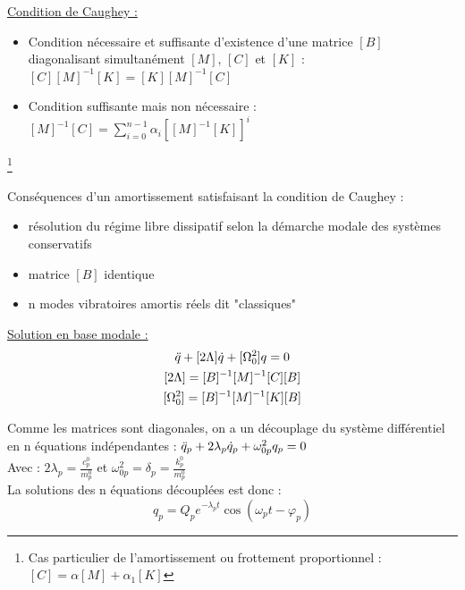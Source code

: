 \documentclass[../main.tex]{subfiles}
\begin{document}
\quad \underline{Condition de Caughey :}\\

\begin{itemize}
    \item Condition nécessaire et suffisante d'existence d'une matrice $[B]$ diagonalisant simultanément $[M]$, $[C]$ et $[K]$ : $[C][M]^{-1}[K] = [K][M]^{-1}[C]$\\
    \item Condition suffisante mais non nécessaire : $[M]^{-1}[C] = \sum_{i=0}^{n-1} \alpha_i [[M]^{-1}[K]]^i$
\end{itemize}

\footnote{Cas particulier de l'amortissement ou frottement proportionnel : $[C] = \alpha [M] + \alpha_1 [K]$}

Conséquences d'un amortissement satisfaisant la condition de Caughey : \begin{itemize}
    \item résolution du régime libre dissipatif selon la démarche modale des systèmes conservatifs\\
    \item matrice $[B]$ identique\\
    \item n modes vibratoires amortis réels dit "classiques"\\
\end{itemize}

\quad \underline{Solution en base modale :}\\
\begin{equation}
\begin{gathered}
    \Ddot{q} + [2\Lambda] \dot{q} + [\Omega_0^2] q = 0\\
    [2\Lambda] = [B]^{-1}[M]^{-1}[C][B]\\
    [\Omega_0^2] = [B]^{-1}[M]^{-1} [K][B]\\
    \end{gathered}
\end{equation}

Comme les matrices sont diagonales, on a un découplage du système différentiel en n équations indépendantes : $\Ddot{q}_p + 2\lambda_p \dot{q}_p + \omega_{0p}^2q_p = 0$\\
Avec : $2\lambda_p = \frac{c_p^0}{m_p^0}$ et $\omega_{0p}^2 = \delta_p = \frac{k_p^0}{m_p^0}$\\

La solutions des n équations découplées est donc : \begin{equation}
    q_p = Q_p e^{-\lambda_p t}\cos(\omega_p t-\varphi_p)
\end{equation}
\end{document}
